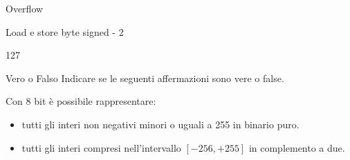 \documentclass[11pt]{article}
\begin{document}
\begin{quiz}{Overflow}
\begin{cloze}[points=1,shuffle=true]{Load e store byte signed - 2}
    \begin{numerical}
        \item 127
    \end{numerical}    
\end{cloze}

\begin{cloze}[points=1,shuffle=false]{Vero o Falso}
    Indicare se le seguenti affermazioni sono vere o false.
    
    Con 8 bit è possibile rappresentare:
    \begin{itemize}
    \item tutti gli interi non negativi minori o uguali a 255 in binario puro.
    \item tutti gli interi compresi nell'intervallo $[-256,+255]$ in complemento a due.
\end{itemize}
\end{cloze}

\end{quiz}
\end{document}
